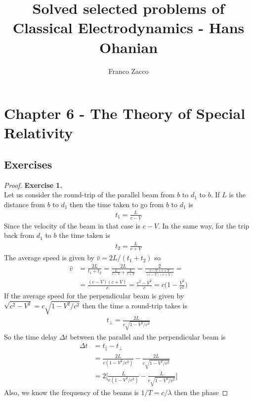 \documentclass[11pt]{article}
\title{\textbf{Solved selected problems of Classical Electrodynamics - Hans Ohanian}}
\author{Franco Zacco}
\date{}
\theoremstyle{definition}
\begin{document}
\maketitle
\thispagestyle{empty}

\section*{Chapter 6 - The Theory of Special Relativity}

\subsection*{Exercises}

\begin{proof}{\textbf{Exercise 1.}}\\
Let us consider the round-trip of the parallel beam from $b$ to $d_1$ to $b$.
If $L$ is the distance from $b$ to $d_1$ then the time taken to go from $b$ to
$d_1$ is
\begin{align*}
    t_1 = \frac{L}{c - V}
\end{align*}
Since the velocity of the beam in that case is $c - V$. In the same way, for
the trip back from $d_1$ to $b$ the time taken is
\begin{align*}
    t_2 = \frac{L}{c + V}
\end{align*}
The average speed is given by $\bar{v} = 2L/(t_1 + t_2)$ so
\begin{align*}
    \bar{v} &= \frac{2L}{t_1 + t_2}
    = \frac{2L}{\frac{L}{c - V} + \frac{L}{c + V}}
    = \frac{2}{\frac{c - V + c + V}{(c - V)(c + V)}} =\\
    &= \frac{(c - V)(c + V)}{c}
    = \frac{c^2 - V^2}{c}
    = c\bigg(1 - \frac{V^2}{c^2}\bigg)
\end{align*}
If the average speed for the perpendicular beam is given by
$\sqrt{c^2 - V^2} = c\sqrt{1 - V^2/c^2}$ then the time a round-trip takes is
\begin{align*}
    t_{\perp} = \frac{2L}{c\sqrt{1 - V^2/c^2}}
\end{align*}
So the time delay $\Delta t$ between the parallel and the perpendicular beam is
\begin{align*}
    \Delta t &= t_{\parallel} - t_{\perp}\\
    &= \frac{2L}{c(1 - V^2/c^2)} - \frac{2L}{c\sqrt{1 - V^2/c^2}}\\
    &= 2\bigg[\frac{L}{c(1 - V^2/c^2)} - \frac{L}{c\sqrt{1 - V^2/c^2}}\bigg]
\end{align*}
Also, we know the frequency of the beams is $1/T = c/\lambda$ then the phase

\end{proof}
\end{document}
